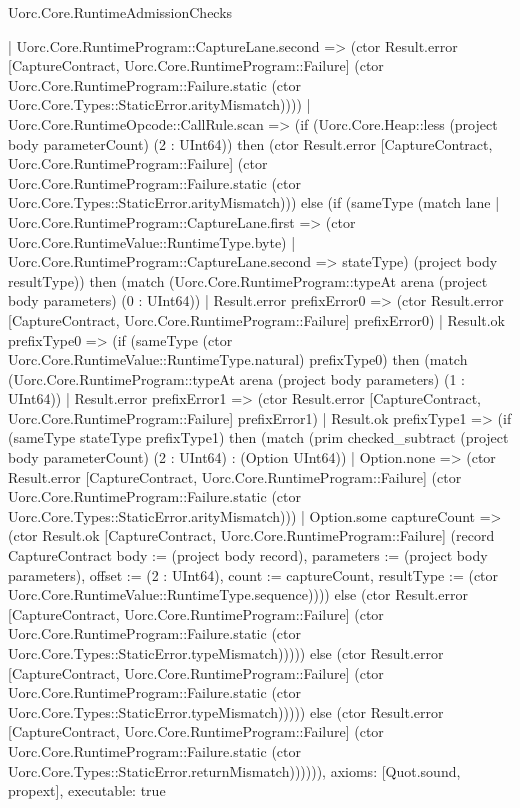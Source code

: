 \begin{lexlean}{Uorc.Core.RuntimeAdmissionChecks}
\begin{semanticmodule}
{      | Uorc.Core.RuntimeProgram::CaptureLane.second => (ctor Result.error [CaptureContract, Uorc.Core.RuntimeProgram::Failure] (ctor Uorc.Core.RuntimeProgram::Failure.static (ctor Uorc.Core.Types::StaticError.arityMismatch))))
    | Uorc.Core.RuntimeOpcode::CallRule.scan => (if (Uorc.Core.Heap::less (project body parameterCount) (2 : UInt64)) then (ctor Result.error [CaptureContract, Uorc.Core.RuntimeProgram::Failure] (ctor Uorc.Core.RuntimeProgram::Failure.static (ctor Uorc.Core.Types::StaticError.arityMismatch))) else (if (sameType (match lane
      | Uorc.Core.RuntimeProgram::CaptureLane.first => (ctor Uorc.Core.RuntimeValue::RuntimeType.byte)
      | Uorc.Core.RuntimeProgram::CaptureLane.second => stateType) (project body resultType)) then (match (Uorc.Core.RuntimeProgram::typeAt arena (project body parameters) (0 : UInt64))
      | Result.error prefixError0 => (ctor Result.error [CaptureContract, Uorc.Core.RuntimeProgram::Failure] prefixError0)
      | Result.ok prefixType0 => (if (sameType (ctor Uorc.Core.RuntimeValue::RuntimeType.natural) prefixType0) then (match (Uorc.Core.RuntimeProgram::typeAt arena (project body parameters) (1 : UInt64))
        | Result.error prefixError1 => (ctor Result.error [CaptureContract, Uorc.Core.RuntimeProgram::Failure] prefixError1)
        | Result.ok prefixType1 => (if (sameType stateType prefixType1) then (match (prim checked_subtract (project body parameterCount) (2 : UInt64) : (Option UInt64))
          | Option.none => (ctor Result.error [CaptureContract, Uorc.Core.RuntimeProgram::Failure] (ctor Uorc.Core.RuntimeProgram::Failure.static (ctor Uorc.Core.Types::StaticError.arityMismatch)))
          | Option.some captureCount => (ctor Result.ok [CaptureContract, Uorc.Core.RuntimeProgram::Failure] (record CaptureContract {body := (project body record), parameters := (project body parameters), offset := (2 : UInt64), count := captureCount, resultType := (ctor Uorc.Core.RuntimeValue::RuntimeType.sequence)}))) else (ctor Result.error [CaptureContract, Uorc.Core.RuntimeProgram::Failure] (ctor Uorc.Core.RuntimeProgram::Failure.static (ctor Uorc.Core.Types::StaticError.typeMismatch))))) else (ctor Result.error [CaptureContract, Uorc.Core.RuntimeProgram::Failure] (ctor Uorc.Core.RuntimeProgram::Failure.static (ctor Uorc.Core.Types::StaticError.typeMismatch))))) else (ctor Result.error [CaptureContract, Uorc.Core.RuntimeProgram::Failure] (ctor Uorc.Core.RuntimeProgram::Failure.static (ctor Uorc.Core.Types::StaticError.returnMismatch)))))),
  axioms: [Quot.sound, propext],
  executable: true
}


\end{semanticmodule}
\end{lexlean}
